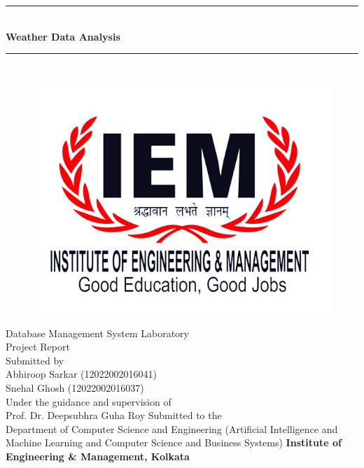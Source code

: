 \documentclass[12pt, a4paper]{article}
\begin{document}
\begin{center}
\rule{\linewidth}{0.5pt} \\
 \vspace{0.6cm}
\textbf{\huge Weather Data Analysis} \\
 \vspace{0.2cm}
\rule{\linewidth}{0.5pt} \\	
 \vspace{-.5cm}
\begin{figure}[h]
\centering
    \includegraphics[width=.5\textwidth]{iem.png}
\end{figure}
\vspace{-.5cm}
\LARGE Database Management System Laboratory\\
\vspace{0.3cm}
\LARGE Project Report \\
\vspace{0.2cm}
\Large Submitted by \\
\large
    Abhiroop Sarkar (12022002016041) \\
    Snehal Ghosh (12022002016037)\\
    Under the guidance and supervision of\\
    Prof. Dr. Deepsubhra Guha Roy
\vspace{1cm}
\large Submitted to the \\ Department of Computer Science and Engineering (Artificial Intelligence and Machine Learning and Computer Science and Business Systems)
\textbf{\large Institute of Engineering \& Management, Kolkata \\ \vspace{0.3cm} }
\vspace{1cm}
\date{}
\end{center}
\newpage
\end{document}

